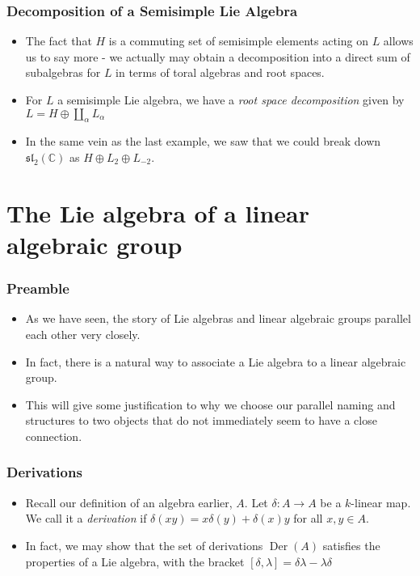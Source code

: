 \documentclass{beamer}
\theoremstyle{remark}
\begin{document}
\begin{frame}
\frametitle{Decomposition of a Semisimple Lie Algebra}
\begin{itemize}
\item The fact that $H$ is a commuting set of semisimple elements acting on $L$ allows us to say more - we actually may obtain a decomposition into a direct sum of subalgebras for $L$ in terms of toral algebras and root spaces.
\pause
\item For $L$ a semisimple Lie algebra, we have a \emph{root space decomposition} given by $L = H \oplus \amalg_{\alpha} L_\alpha$
\pause
\item In the same vein as the last example, we saw that we could break down $\mathfrak{sl}_2(\mathbb{C})$ as $H \oplus L_2 \oplus L_{-2}$.
\end{itemize}
\end{frame}


\section{The Lie algebra of a linear algebraic group}

\begin{frame}
\frametitle{Preamble}
\begin{itemize}
\item As we have seen, the story of Lie algebras and linear algebraic groups parallel each other very closely.
\pause
\item In fact, there is a natural way to associate a Lie algebra to a linear algebraic group.
\pause
\item This will give some justification to why we choose our parallel naming and structures to two objects that do not immediately seem to have a close connection.
\end{itemize}
\end{frame}

\begin{frame}
\frametitle{Derivations}
\begin{itemize}
\item Recall our definition of an algebra earlier, $A$. Let $\delta:  A \to A$ be a $k$-linear map. We call it a \emph{derivation} if $\delta(xy) = x \delta(y) + \delta(x)y$ for all $x, y \in A$.
\pause
\item In fact, we may show that the set of derivations $\operatorname{Der}(A)$ satisfies the properties of a Lie algebra, with the bracket $[\delta, \lambda] = \delta \lambda - \lambda \delta$
\end{itemize}
\end{frame}
\end{document}
